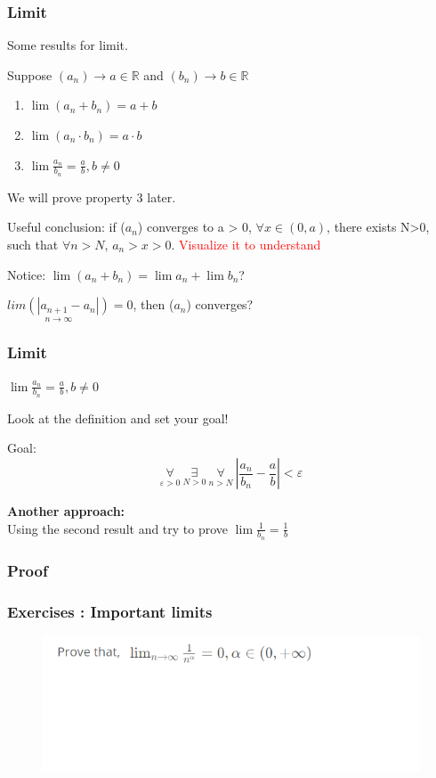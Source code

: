 \documentclass{beamer}
\begin{document}
\begin{frame}
    \frametitle{Limit}
    Some  results for limit.\\
    \begin{center}
        Suppose $(a_n)\rightarrow a \in \mathbb{R}$ and $(b_n)\rightarrow b \in \mathbb{R}$
    \end{center}
    \begin{enumerate}
        \item $\lim (a_n+b_n)=a+b$
        \item $\lim (a_n\cdot b_n) =a\cdot b$
        \item $\lim \frac{a_n}{b_n}=\frac{a}{b}, b\neq 0$
    \end{enumerate}
    We will prove property 3 later.

    Useful conclusion: if ($a_{n}$) converges to a > 0, $\forall x \in (0,a)$, there exists N>0, such that $\forall n > N$, $a_{n}>x>0$. \textcolor{red}{Visualize it to understand}
    \begin{block}{Notice:}
        \hspace{1em}
        $\lim (a_n+b_n)=\lim a_n + \lim b_n$?

        \quad $\underset{n\rightarrow \infty}{lim(\left|a_{n+1}-a_{n}\right|)}=0$, then ($a_{n}$) converges?
    \end{block}
\end{frame}
\begin{frame}
    \frametitle{Limit}
    \begin{center}
        $\lim \frac{a_n}{b_n}=\frac{a}{b}, b\neq 0$
    \end{center}
    Look at the definition and set your goal!
    \begin{block}{Goal:}
        \hspace{10em}
        $$\underset{\varepsilon>0}{\forall}~ \underset{N>0}{\exists} ~\underset{n>N}{\forall}~ |\frac{a_n}{b_n}-\frac{a}{b}|<\varepsilon$$
    \end{block}
    \textbf{Another approach:}\\
    \hspace{1em} Using the second result and try to prove $\lim \frac{1}{b_n}=\frac{1}{b}$
\end{frame}
\begin{frame}
    \frametitle{Proof}
\end{frame}

\begin{frame}
    \frametitle{Exercises : Important limits}
    \begin{figure}[htbp]
        \centering
        \includegraphics[width=12cm]{limit1.png}
    \end{figure}
\end{frame}
\end{document}
